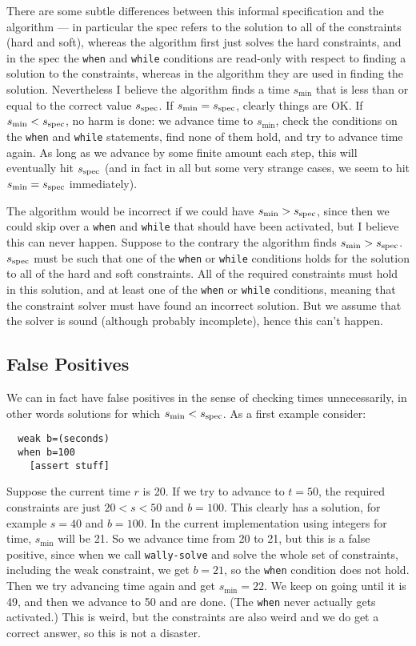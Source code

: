 \documentclass{article}
\begin{document}
There are some subtle differences between this informal specification
and the algorithm --- in particular the spec refers to the solution to
all of the constraints (hard and soft), whereas the algorithm first
just solves the hard constraints, and in the spec the \verb|when| and
\verb|while| conditions are read-only with respect to finding a
solution to the constraints, whereas in the algorithm they are used in
finding the solution.  Nevertheless I believe the algorithm finds a
time $s_{\min}$ that is less than or equal to the correct value
$s_{\rm spec}$.  If $s_{\min} = s_{\rm spec}$, clearly things are
OK\@.  If $s_{\min} < s_{\rm spec}$, no harm is done: we advance time
to $s_{\min}$, check the conditions on the \verb|when| and
\verb|while| statements, find none of them hold, and try to advance
time again.  As long as we advance by some finite amount each step,
this will eventually hit $s_{\rm spec}$ (and in fact in all but some
very strange cases, we seem to hit $s_{\min} = s_{\rm spec}$
immediately).

The algorithm would be incorrect if we could have $s_{\min} > s_{\rm spec}$,
since then we could skip over a \verb|when| and \verb|while| that
should have been activated, but I believe this can never happen.
Suppose to the contrary the algorithm finds $s_{\min} > s_{\rm spec}$.  
$s_{\rm spec}$ must be such that one of the \verb|when| or
\verb|while| conditions holds for the solution to all of the hard and
soft constraints.  All of the required constraints must hold in this
solution, and at least one of the \verb|when| or \verb|while|
conditions, meaning that the constraint solver must have found an
incorrect solution.  But we assume that the solver is sound (although
probably incomplete), hence this can't happen.

\subsection{False Positives}
\label{sec:false-positives}

We can in fact have false positives in the sense of checking times
unnecessarily, in other words solutions for which 
$s_{\min} < s_{\rm spec}$.  As a first example consider:

\begin{verbatim}
  weak b=(seconds)
  when b=100
    [assert stuff]
\end{verbatim}

Suppose the current time $r$ is 20.  If we try to advance to $t=50$,
the required constraints are just $20<s<50$ and $b=100$.  This clearly
has a solution, for example $s=40$ and $b=100$.  In the current
implementation using integers for time, $s_{\min}$ will be 21.  So we
advance time from 20 to 21, but this is a false positive, since when
we call \verb|wally-solve| and solve the whole set of constraints,
including the weak constraint, we get $b=21$, so the \verb|when|
condition does not hold.  Then we try advancing time again and get
$s_{\min}=22$.  We keep on going until it is 49, and then we advance
to 50 and are done.  (The \verb|when| never actually gets activated.)
This is weird, but the constraints are also weird and we do get a
correct answer, so this is not a disaster.
\end{document}
